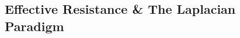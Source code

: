 \documentclass[12pt]{article}
\numberwithin{equation}{section}
\newcommand{\+}{%
	\raisebox{0.18ex}{\scaleobj{0.55}{+}}
}
\theoremstyle{definition}
\begin{document}
\subsection{Effective Resistance \& The Laplacian Paradigm}






 




  
\end{document}

